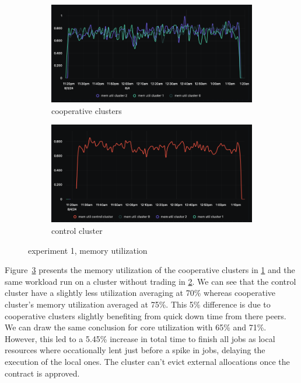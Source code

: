 \begin{figure}[H]
\centering
\begin{subfigure}{.5\textwidth}
  \centering
  \includegraphics[width=.9\linewidth]{./figures/experiment-one/cooperative-clusters-all-at-100-trading-mem-util.png}
  \caption{cooperative clusters}
  \label{fig:exp1coop}
\end{subfigure}%
\begin{subfigure}{.5\textwidth}
  \centering
  \includegraphics[width=.9\linewidth]{./figures/experiment-one/control-mem-util.png}
  \caption{control cluster}
  \label{fig:exp1control}
\end{subfigure}
\caption{experiment 1, memory utilization}
\label{fig:exp1memutil}
\end{figure}

Figure~\ref{fig:exp1memutil} presents the memory utilization of the cooperative
clusters in \ref{fig:exp1coop} and the same workload run on a cluster without
trading in \ref{fig:exp1control}.
We can see that the control cluster have a slightly less utilization averaging
at 70\% whereas cooperative cluster's memory utilization averaged at 75\%. This
5\% difference is due to cooperative clusters slightly benefiting from quick
down time from there peers. We can draw the same conclusion for core
utilization with 65\% and 71\%. However, this led to a 5.45\% increase in
total time to finish all jobs as local resources where occationally lent just
before a spike in jobs, delaying the execution of the local ones. The cluster can't evict external allocations once the
contract is approved.

